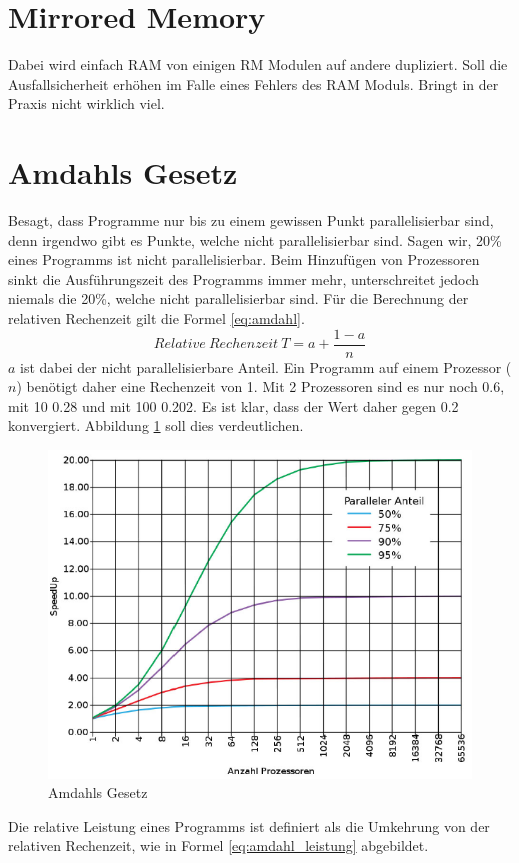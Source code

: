 \section{Mirrored Memory}
Dabei wird einfach RAM von einigen RM Modulen auf andere dupliziert. Soll die Ausfallsicherheit erhöhen im Falle eines Fehlers des RAM Moduls. Bringt in der Praxis nicht wirklich viel.

\section{Amdahls Gesetz}
Besagt, dass Programme nur bis zu einem gewissen Punkt parallelisierbar sind, denn irgendwo gibt es Punkte, welche nicht parallelisierbar sind. Sagen wir, 20\% eines Programms ist nicht parallelisierbar. Beim Hinzufügen von Prozessoren sinkt die Ausführungszeit des Programms immer mehr, unterschreitet jedoch niemals die 20\%, welche nicht parallelisierbar sind. 
Für die Berechnung der relativen Rechenzeit gilt die Formel \ref{eq:amdahl}.
\begin{equation}\label{eq:amdahl}
Relative\ Rechenzeit\ T = a + \frac{1-a}{n}
\end{equation}
$ a $ ist dabei der nicht parallelisierbare Anteil. Ein Programm auf einem Prozessor ($ n $) benötigt daher eine Rechenzeit von 1. Mit 2 Prozessoren sind es nur noch 0.6, mit 10 0.28 und mit 100 0.202. Es ist klar, dass der Wert daher gegen 0.2 konvergiert.
Abbildung \ref{fig:amdahl} soll dies verdeutlichen.
\begin{figure}
\centering
\includegraphics[width=0.7\linewidth]{fig/amdahl}
\caption{Amdahls Gesetz}
\label{fig:amdahl}
\end{figure}
Die relative Leistung eines Programms ist definiert als die Umkehrung von der relativen Rechenzeit, wie in Formel \ref{eq:amdahl_leistung} abgebildet.

